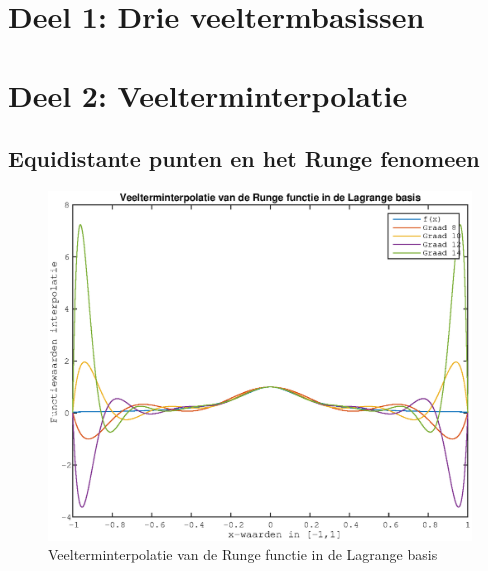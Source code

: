 \documentclass{article}
\newcommand{\problemAnswer}[1]{ %
\noindent\framebox[\columnwidth][c]{\begin{minipage}{0.98\columnwidth}#1\end{minipage}} %
}
\begin{document}

\section{Deel 1: Drie veeltermbasissen}
\problemAnswer{

}



\section{Deel 2: Veelterminterpolatie}


\subsection{Equidistante punten en het Runge fenomeen}

\begin{center}
\begin{figure}[h!]
\includegraphics[width=0.75\columnwidth]{lagrange_interpolatie}
\caption{Veelterminterpolatie van de Runge functie in de Lagrange basis} %
\end{figure}
\end{center}
\end{document}
